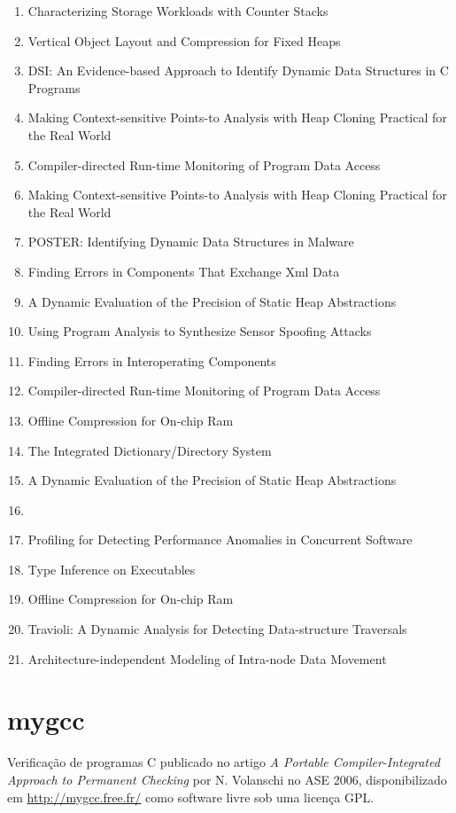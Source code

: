 \begin{enumerate}
\item Characterizing Storage Workloads with Counter Stacks
\item Vertical Object Layout and Compression for Fixed Heaps
\item DSI: An Evidence-based Approach to Identify Dynamic Data Structures in C Programs
\item Making Context-sensitive Points-to Analysis with Heap Cloning Practical for the Real World
\item Compiler-directed Run-time Monitoring of Program Data Access
\item Making Context-sensitive Points-to Analysis with Heap Cloning Practical for the Real World
\item POSTER: Identifying Dynamic Data Structures in Malware
\item Finding Errors in Components That Exchange Xml Data
\item A Dynamic Evaluation of the Precision of Static Heap Abstractions
\item Using Program Analysis to Synthesize Sensor Spoofing Attacks
\item Finding Errors in Interoperating Components
\item Compiler-directed Run-time Monitoring of Program Data Access
\item Offline Compression for On-chip Ram
\item The Integrated Dictionary/Directory System
\item A Dynamic Evaluation of the Precision of Static Heap Abstractions
\item 
\item Profiling for Detecting Performance Anomalies in Concurrent Software
\item Type Inference on Executables
\item Offline Compression for On-chip Ram
\item Travioli: A Dynamic Analysis for Detecting Data-structure Traversals
\item Architecture-independent Modeling of Intra-node Data Movement
\end{enumerate}

\section{mygcc}

Verificação de programas C
publicado no artigo {\it A Portable Compiler-Integrated Approach to Permanent Checking}
por N. Volanschi
no ASE 2006,
disponibilizado em \url{http://mygcc.free.fr/}
como software livre
sob uma licença GPL.

